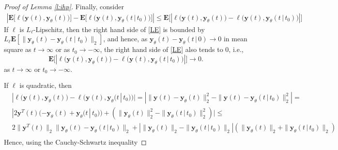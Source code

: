 \documentclass{article}
\newcommand{\y}{\mathbf{y}}
\newcommand{\bE}{\mathbf{E}}
\begin{document}
\begin{proof}[Proof of Lemma \ref{l:ihp}]
Finally, consider
\begin{align}\label{LE}
\left|\bE\big[\ell\big(\y(t),\y_\theta(t)\big)\big]-\bE\big[\ell\big(\y(t),\y_\theta(t\,|\,t_0)\big)\big]\right|
\le \bE\big[\left|\ell\big(\y(t),\y_\theta(t)\big)-\ell\big(\y(t),\y_\theta(t\,|\,t_0)\big)\right|\big]
\end{align}
If $\ell$ is $L_\ell$-Lipschitz, then
the right hand side of \eqref{LE} is bounded by $L_\ell \bE[\|\y_\theta(t) - \y_\theta(t\mid t_0) \|_2]$, 
and hence, as $\y_\theta(t)-\y_\theta(t\,|\,0)\to 0$ in mean square as $t\to\infty$ or 
as $t_0 \to -\infty$, the right hand side of \eqref{LE} also tends to $0$, i.e., 
\[
   \bE\big[\left|\ell\big(\y(t),\y_\theta(t)\big)-\ell\big(\y(t),\y_\theta(t\,|\,t_0)\big)\right|\big] \to 0.
\]
as $t \to \infty$ or $t_0 \to -\infty$.

If $\ell$ is quadratic, then 
\begin{align*}
  & |\ell\big(\y(t),\y_\theta(t)\big)-\ell\big(\y(t),\y_\theta(t\,|\,t_0)\big)|=
    \left|\|\y(t)-\y_\theta(t)\|_2^2 - \|\y(t)-\y_\theta(t\,|\,t_0)\|_2^2\right|= \\
  & |2\y^T(t)(-\y_\theta(t)+\y_\theta(t\,|\,t_0))+\left(\|\y_\theta(t)\|_2^2-\|\y_\theta(t\,|\,t_0)\|_2^2\right)| \le \\
  & 2\|\y^T(t)\|_2 \|\y_\theta(t)-\y_\theta(t\,|\,t_0)\|_2 + \left|\|\y_\theta(t)\|_2-\|\y_\theta(t\,|\,t_0)\|_2\right| \left(\|\y_\theta(t)\|_2+\|\y_\theta(t\,|\,t_0)\|_2\right)\\
\end{align*}
Hence, using the Cauchy-Schwartz  inequality

\end{proof}
\end{document}
